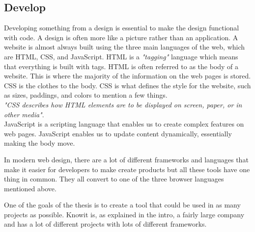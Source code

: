 \subsection{Develop}%
\label{sub:Develop}
Developing something from a design is essential to make the design functional with code. A design is often more like a picture rather than an application. A website is almost always built using the three main languages of the web, which are HTML, CSS, and JavaScript. HTML is a \textit{"tagging"} language which means that everything is built with tags. HTML is often referred to as the body of a website. This is where the majority of the information on the web pages is stored.
CSS is the clothes to the body. CSS is what defines the style for the website, such as sizes, paddings, and colors to mention a few things.\\ 
\textit{"CSS describes how HTML elements are to be displayed on screen, paper, or in other media"}\cite{CSSIntroduction}.\\
JavaScript is a scripting language that enables us to create complex features on web pages. JavaScript enables us to update content dynamically, essentially making the body move.





In modern web design, there are a lot of different frameworks and languages that make it easier for developers to make create products but all these tools have one thing in common. They all convert to one of the three browser languages mentioned above. 

One of the goals of the thesis is to create a tool that could be used in as many projects as possible. Knowit is, as explained in the intro, a fairly large company and has a lot of different projects with lots of different frameworks.   


